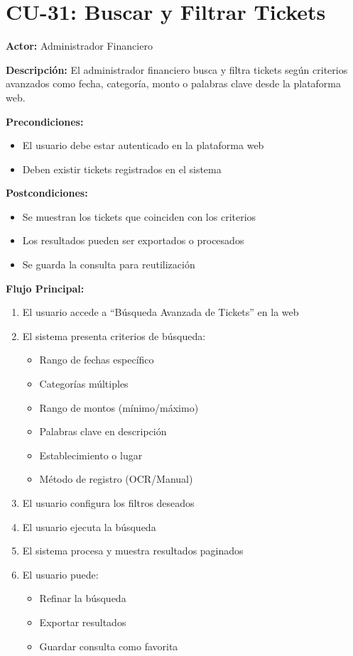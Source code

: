 \section{CU-31: Buscar y Filtrar Tickets}

\noindent\textbf{Actor:} Administrador Financiero

\noindent\textbf{Descripción:} El administrador financiero busca y filtra tickets según criterios avanzados como fecha, categoría, monto o palabras clave desde la plataforma web.

\noindent\textbf{Precondiciones:}
\begin{itemize}
    \item El usuario debe estar autenticado en la plataforma web
    \item Deben existir tickets registrados en el sistema
\end{itemize}

\noindent\textbf{Postcondiciones:}
\begin{itemize}
    \item Se muestran los tickets que coinciden con los criterios
    \item Los resultados pueden ser exportados o procesados
    \item Se guarda la consulta para reutilización
\end{itemize}

\noindent\textbf{Flujo Principal:}
\begin{enumerate}
    \item El usuario accede a ``Búsqueda Avanzada de Tickets'' en la web
    \item El sistema presenta criterios de búsqueda:
    \begin{itemize}
        \item Rango de fechas específico
        \item Categorías múltiples
        \item Rango de montos (mínimo/máximo)
        \item Palabras clave en descripción
        \item Establecimiento o lugar
        \item Método de registro (OCR/Manual)
    \end{itemize}
    \item El usuario configura los filtros deseados
    \item El usuario ejecuta la búsqueda
    \item El sistema procesa y muestra resultados paginados
    \item El usuario puede:
    \begin{itemize}
        \item Refinar la búsqueda
        \item Exportar resultados
        \item Guardar consulta como favorita
    \end{itemize}
\end{enumerate}

